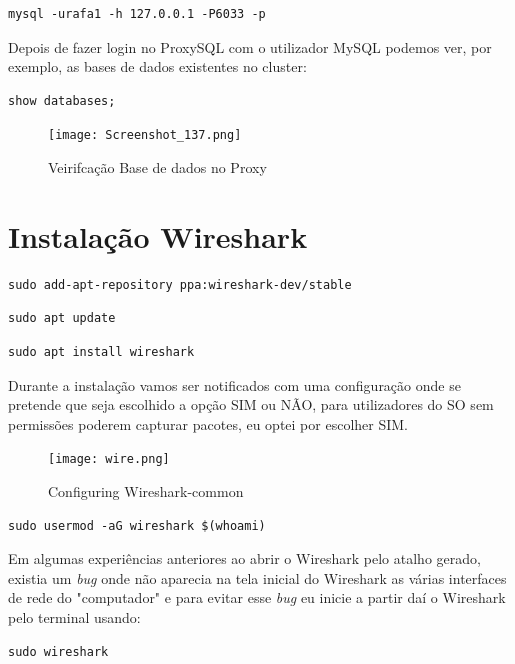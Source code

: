 \begin{verbatim}mysql -urafa1 -h 127.0.0.1 -P6033 -p\end{verbatim}

Depois de fazer login no ProxySQL com o utilizador MySQL podemos ver, por exemplo, as bases de dados existentes no cluster:

\begin{verbatim}show databases;\end{verbatim}

\begin{figure}[H]
\center
\texttt{[image: Screenshot\_137.png]}
\caption{Veirifcação Base de dados no Proxy}
\end{figure}

\newpage
\section{Instalação Wireshark}

\begin{verbatim}sudo add-apt-repository ppa:wireshark-dev/stable\end{verbatim}

\begin{verbatim}sudo apt update\end{verbatim}

\begin{verbatim}sudo apt install wireshark\end{verbatim}

Durante a instalação vamos ser notificados com uma configuração onde se pretende que seja escolhido a opção SIM ou NÃO, para utilizadores do \ac{SO} sem permissões poderem capturar pacotes, eu optei por escolher SIM. 

\begin{figure}[H]
\center
\texttt{[image: wire.png]}
\caption{Configuring Wireshark-common}
\end{figure}

\begin{verbatim}sudo usermod -aG wireshark $(whoami)\end{verbatim}

Em algumas experiências anteriores ao abrir o Wireshark pelo atalho gerado, existia um \textit{bug} onde não aparecia na tela inicial do Wireshark as várias interfaces de rede do "computador" e para evitar esse \textit{bug} eu inicie a partir daí o Wireshark pelo terminal usando:

\begin{verbatim}sudo wireshark\end{verbatim}

